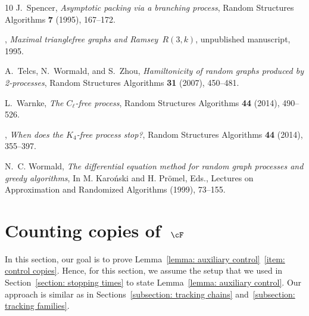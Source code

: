 \documentclass[11pt]{amsart}
\theoremstyle{definition}
\numberwithin{equation}{section}
\begin{document}
\begin{thebibliography}{10}
J.~Spencer, \emph{Asymptotic packing via a branching process}, Random Structures Algorithms \textbf{7} (1995), 167--172.

\bysame, \emph{Maximal trianglefree graphs and {R}amsey~{$R(3,k)$}}, unpublished manuscript, 1995.

A.~Telcs, N.~Wormald, and S.~Zhou, \emph{Hamiltonicity of random graphs produced by 2-processes}, Random Structures Algorithms \textbf{31} (2007), 450--481.

L.~Warnke, \emph{The {$C_\ell$}-free process}, Random Structures Algorithms \textbf{44} (2014), 490--526.

\bysame, \emph{When does the {$K_4$}-free process stop?}, Random Structures Algorithms \textbf{44} (2014), 355--397.

N.~C. Wormald, \emph{The differential equation method for random graph processes and greedy algorithms}, In M. Karo\'{n}ski and H. Pr\"{o}mel, Eds., Lectures on Approximation and Randomized Algorithms (1999), 73--155.

\end{thebibliography}



	
	\appendix
	
	\section{Counting copies of~\texorpdfstring{$\cF$}{F}}\label{appendix: copies}
	In this section, our goal is to prove Lemma~\ref{lemma: auxiliary control}~\ref{item: control copies}.
	Hence, for this section, we assume the setup that we used in Section~\ref{section: stopping times} to state Lemma~\ref{lemma: auxiliary control}.
	Our approach is similar as in Sections~\ref{subsection: tracking chains} and~\ref{subsection: tracking families}.
	
\end{document}

